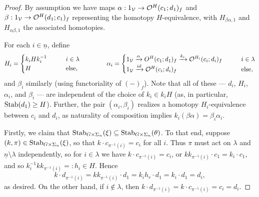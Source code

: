 \documentclass[a4paper,10pt
]{article}%
\renewcommand{\1}{\ensuremath{\mathbb{id}}}
\begin{document}
\begin{proof}
      By assumption we have maps
      $\alpha: 1_{\mathcal V} \to \mathcal{O}^H(c_1;d_1)_f$ and $\beta: 1_{\mathcal V} \to \mathcal{O}^H(d_1;c_1)_f$
      representing the homotopy $H$-equivalence,
      with $H_{\beta\alpha,1}$ and $H_{\alpha\beta,1}$ the associated homotopies.
      
      For each $i \in \underline{n}$, define
      \begin{equation}
            \label{WEAKEQCOLORS_EQ}
            H_i =
            \begin{cases}
                  k_i H k_i^{-1} \qquad & i \in \lambda
                  \\
                  H & \mbox{else,}
            \end{cases}
            \qquad
            \qquad 
            \alpha_i =
            \begin{cases}
                  1_{\mathcal V} \xrightarrow{\alpha} O^H(c_1;d_1)_f \xrightarrow{k_i} \mathcal{O}^{H_i}(c_i;d_i)_f \qquad & i \in \lambda
                  \\
                  1_{\mathcal V} \xrightarrow{id} \mathcal{O}^H(c_i;d_i)_f & \mbox{else},
            \end{cases}
      \end{equation}
      and $\beta_i$ similarly
      (using functoriality of $(-)_f$).
      Note that all of these --- $d_i$, $H_i$, $\alpha_i$, and $\beta_i$ --- are independent of the choice of $k_i\in k_i H$
      (as, in particular, $\mathrm{Stab}(d_1) \geq H$).
      Further, 
      the pair $(\alpha_i,\beta_i)$ realizes a homotopy $H_i$-equivalence between $c_i$ and $d_i$,
      as naturality of composition implies
      $k_i (\beta\alpha) = \beta_i\alpha_i$. 

      Firstly, we claim that $\mathrm{Stab}_{G \times \Sigma_n}(\xi) \subseteq \mathrm{Stab}_{G \times \Sigma_n}(\theta)$.
      To that end, suppose $(k,\pi)\in \mathrm{Stab}_{G\times \Sigma_n}(\xi)$, so that $k \cdot c_{\pi^{-1}(i)} = c_i$ for all $i$.
      Thus $\pi$ must act on $\lambda$ and $\underline{n} \setminus \lambda$ independently,
      so for $i \in \lambda$ we have $k \cdot c_{\pi^{-1}(i)} = c_i$, or
      $k k_{\pi^{-1}(i)} \cdot c_1 = k_i \cdot c_1$, and so
      $k_i^{-1} k k_{\pi^{-1}(i)} =:h_i \in H$. Hence 
      \begin{equation}
            k \cdot d_{\pi^{-1}(i)} = k k_{\pi^{-1}(i)} \cdot d_1 = k_i h_r \cdot d_1 = k_i \cdot d_1 = d_i,
      \end{equation}
      as desired.
      On the other hand, if $i \not \in \lambda$, then
      $k \cdot d_{\pi^{-1}(i)} = k \cdot c_{\pi^{-1}(i)} = c_i = d_i$.
      

\end{proof}
\end{document}
